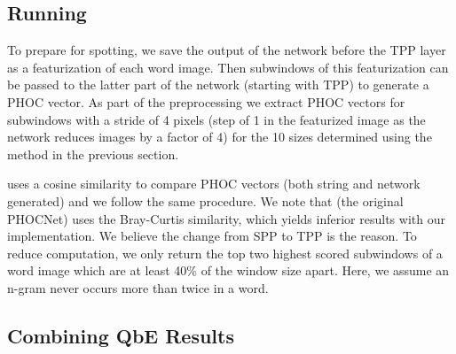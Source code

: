 \documentclass[ms,electronic,twosidetoc,letterpaper,chaptercenter,parttop,lol,lof,lot]{byumsphd}
\begin{document}
\subsection{Running}

To prepare for spotting, we save the output of the network before the TPP layer as a featurization of each word image. Then subwindows of this featurization can be passed to the latter part of the network (starting with TPP) to generate a PHOC vector. As part of the preprocessing we extract PHOC vectors for subwindows with a stride of 4 pixels (step of 1 in the featurized image as the network reduces images by a factor of 4) for the 10 sizes determined using the method in the previous section.


\cite{sudholt2017} uses a cosine similarity to compare PHOC vectors (both string and network generated) and we follow the same procedure. We note that \cite{sudholt2016} (the original PHOCNet) uses the Bray-Curtis similarity, which yields inferior results with our implementation. We believe the change from SPP to TPP is the reason.
To reduce computation, we only return the top two highest scored subwindows of a word image which are at least 40\% of the window size apart. Here, we assume an n-gram never occurs more than twice in a word.%



\subsection{Combining QbE Results}\label{combine}
\end{document}
